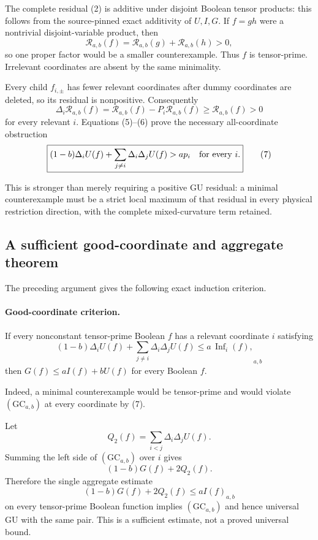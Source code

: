 The complete residual (2) is additive under disjoint Boolean tensor
products: this follows from the source-pinned exact additivity of $U,I,G$.
If $f=gh$ were a nontrivial disjoint-variable product, then
\[
 \mathcal R_{a,b}(f)=\mathcal R_{a,b}(g)+\mathcal R_{a,b}(h)>0,
\]
so one proper factor would be a smaller counterexample.  Thus $f$ is
tensor-prime.  Irrelevant coordinates are absent by the same minimality.

Every child $f_{i,\pm}$ has fewer relevant coordinates after dummy
coordinates are deleted, so its residual is nonpositive.  Consequently
\[
 \Delta_i\mathcal R_{a,b}(f)
 =\mathcal R_{a,b}(f)-P_i\mathcal R_{a,b}(f)
 \ge \mathcal R_{a,b}(f)>0                             \tag{6}
\]
for every relevant $i$.  Equations (5)--(6) prove the necessary
all-coordinate obstruction
\[
 \boxed{
 (1-b)\Delta_iU(f)+\sum_{j\ne i}\Delta_i\Delta_jU(f)>a p_i
 \quad\hbox{for every }i.}                            \tag{7}
\]

This is stronger than merely requiring a positive GU residual: a minimal
counterexample must be a strict local maximum of that residual in every
physical restriction direction, with the complete mixed-curvature term
retained.

\subsection*{A sufficient good-coordinate and aggregate theorem}

The preceding argument gives the following exact induction criterion.

\paragraph{Good-coordinate criterion.}
If every nonconstant tensor-prime Boolean $f$ has a relevant coordinate
$i$ satisfying
\[
 \boxed{
 (1-b)\Delta_iU(f)+\sum_{j\ne i}\Delta_i\Delta_jU(f)
 \le a\,\operatorname{Inf}_i(f),}                    \tag{GC}_{a,b}
\]
then $G(f)\le aI(f)+bU(f)$ for every Boolean $f$.

Indeed, a minimal counterexample would be tensor-prime and would violate
$(\mathrm{GC}_{a,b})$ at every coordinate by (7).

Let
\[
 Q_2(f)=\sum_{i<j}\Delta_i\Delta_jU(f).               \tag{8}
\]
Summing the left side of $(\mathrm{GC}_{a,b})$ over $i$ gives
\[
 (1-b)G(f)+2Q_2(f).                                   \tag{9}
\]
Therefore the single aggregate estimate
\[
 \boxed{(1-b)G(f)+2Q_2(f)\le aI(f)}                  \tag{AG}_{a,b}
\]
on every tensor-prime Boolean function implies $(\mathrm{GC}_{a,b})$ and
hence universal GU with the same pair.  This is a sufficient estimate,
not a proved universal bound.

